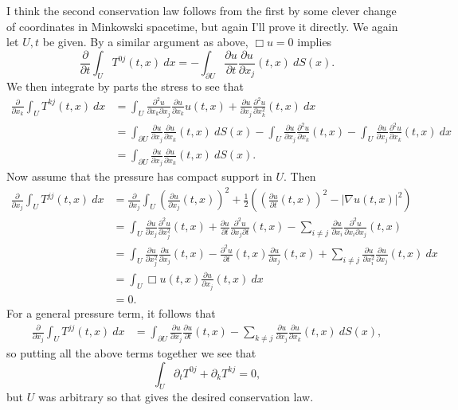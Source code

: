 \documentclass[10pt]{article}
\theoremstyle{definition}
\begin{document}
I think the second conservation law follows from the first by some clever change of coordinates in Minkowski spacetime, but again I'll prove it directly.
We again let $U,t$ be given. By a similar argument as above, $\Box u = 0$ implies
$$\frac{\partial}{\partial t} \int_U T^{0j}(t, x) ~dx = -\int_{\partial U} \frac{\partial u}{\partial t} \frac{\partial u}{\partial x_j}(t, x) ~dS(x).$$
We then integrate by parts the stress to see that
\begin{align*}
\frac{\partial}{\partial x_k} \int_U T^{kj}(t, x) ~dx &= \int_U \frac{\partial^2 u}{\partial x_k \partial x_j} \frac{\partial u}{\partial x_k} u(t, x) + \frac{\partial u}{\partial x_j}\frac{\partial^2 u}{\partial x_k^2}(t, x) ~dx\\
&= \int_{\partial U} \frac{\partial u}{\partial x_j} \frac{\partial u}{\partial x_k}(t, x) ~dS(x) - \int_U \frac{\partial u}{\partial x_j} \frac{\partial^2 u}{\partial x_k}(t, x) - \int_U \frac{\partial u}{\partial x_j} \frac{\partial^2 u}{\partial x_k}(t, x) ~dx\\
&= \int_{\partial U} \frac{\partial u}{\partial x_j} \frac{\partial u}{\partial x_k}(t, x) ~dS(x).
\end{align*}
Now assume that the pressure has compact support in $U$. Then
\begin{align*}
\frac{\partial}{\partial x_j} \int_U T^{jj}(t, x) ~dx &= \frac{\partial}{\partial x_j} \int_U \left(\frac{\partial u}{\partial x_j}(t, x)\right)^2 + \frac{1}{2}\left(\left(\frac{\partial u}{\partial t}(t, x)\right)^2 - |\nabla u(t, x)|^2\right)\\
&= \int_U \frac{\partial u}{\partial x_j} \frac{\partial^2 u}{\partial x_j^2}(t, x) + \frac{\partial u}{\partial t} \frac{\partial^2 u}{\partial x_j \partial t}(t, x) - \sum_{i \neq j} \frac{\partial u}{\partial x_i} \frac{\partial^2 u}{\partial x_i \partial x_j}(t, x)\\
&= \int_U \frac{\partial u}{\partial x_j^2} \frac{\partial u}{\partial x_j}(t, x) - \frac{\partial^2 u}{\partial t}(t, x) \frac{\partial u}{\partial x_j}(t, x) + \sum_{i \neq j} \frac{\partial u}{\partial x_i^2} \frac{\partial u}{\partial x_j}(t, x) ~dx\\
&= \int_U \Box u(t, x) \frac{\partial u}{\partial x_j}(t, x) ~dx\\
&= 0.
\end{align*}
For a general pressure term, it follows that
\begin{align*}
\frac{\partial}{\partial x_j} \int_U T^{jj}(t, x) ~dx &= \int_{\partial U} \frac{\partial u}{\partial x_j} \frac{\partial u}{\partial t}(t, x) - \sum_{k \neq j} \frac{\partial u}{\partial x_j} \frac{\partial u}{\partial x_k}(t, x) ~dS(x),
\end{align*}
so putting all the above terms together we see that
$$\int_U \partial_t T^{0j} + \partial_k T^{kj} = 0,$$
but $U$ was arbitrary so that gives the desired conservation law.
\end{document}
